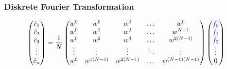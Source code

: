 \documentclass[11pt,aspectratio=169]{beamer}
\begin{document}
	\begin{frame}
	\frametitle{Diskrete Fourier Transformation}
	\[
	\begin{pmatrix}
		\hat{c}_1 \\\hat{c}_2 \\\hat{c}_3 \\ \vdots \\\hat{c}_n
	\end{pmatrix}
	= \frac{1}{N}
	\begin{pmatrix}
		w^0 & w^0   & w^0  & \dots  &w^0     \\
		w^0 & w^1   &w^2   & \dots  &w^{N-1}     \\ 
		w^0 & w^2   &w^4   & \dots  &w^{2(N-1)}  \\ 
		\vdots   & \vdots     &\vdots     &\ddots  &\vdots       \\
		w^0 & w^{1(N-1)}&w^{2(N-1)}& \dots  &w^{(N-1)(N-1)}  \\ 
	\end{pmatrix}
	\begin{pmatrix}
		\textcolor{blue}{f_0}  	\\
		\textcolor{blue}{f_1}	\\
		\textcolor{blue}{f_2}	\\	 
 		\vdots  \\
	 	0  \\ 
	\end{pmatrix}
	\]
	\end{frame}
\end{document}
